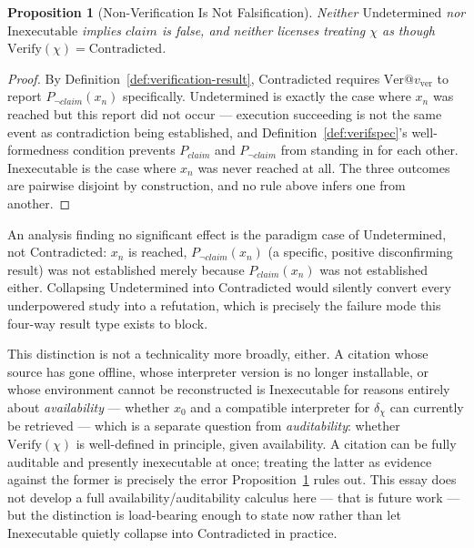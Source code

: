 \documentclass[11pt]{article}
\newtheorem{proposition}[theorem]{Proposition}
\theoremstyle{definition}
\begin{document}
\begin{proposition}[Non-Verification Is Not Falsification]
\label{prop:nonverification-not-false}
Neither $\mathrm{Undetermined}$ nor $\mathrm{Inexecutable}$ implies $\mathit{claim}$ is false, and neither licenses treating $\chi$ as though $\mathrm{Verify}(\chi) = \mathrm{Contradicted}$.
\end{proposition}
\begin{proof}
By Definition~\ref{def:verification-result}, $\mathrm{Contradicted}$ requires $\mathrm{Ver}@v_{\mathrm{ver}}$ to report $P_{\neg\mathit{claim}}(x_n)$ specifically. $\mathrm{Undetermined}$ is exactly the case where $x_n$ was reached but this report did not occur --- execution succeeding is not the same event as contradiction being established, and Definition~\ref{def:verifspec}'s well-formedness condition prevents $P_{\mathit{claim}}$ and $P_{\neg\mathit{claim}}$ from standing in for each other. $\mathrm{Inexecutable}$ is the case where $x_n$ was never reached at all. The three outcomes are pairwise disjoint by construction, and no rule above infers one from another.
\end{proof}

An analysis finding no significant effect is the paradigm case of $\mathrm{Undetermined}$, not $\mathrm{Contradicted}$: $x_n$ is reached, $P_{\neg\mathit{claim}}(x_n)$ (a specific, positive disconfirming result) was not established merely because $P_{\mathit{claim}}(x_n)$ was not established either. Collapsing $\mathrm{Undetermined}$ into $\mathrm{Contradicted}$ would silently convert every underpowered study into a refutation, which is precisely the failure mode this four-way result type exists to block.

This distinction is not a technicality more broadly, either. A citation whose source has gone offline, whose interpreter version is no longer installable, or whose environment cannot be reconstructed is $\mathrm{Inexecutable}$ for reasons entirely about \emph{availability} --- whether $x_0$ and a compatible interpreter for $\delta_\chi$ can currently be retrieved --- which is a separate question from \emph{auditability}: whether $\mathrm{Verify}(\chi)$ is well-defined in principle, given availability. A citation can be fully auditable and presently inexecutable at once; treating the latter as evidence against the former is precisely the error Proposition~\ref{prop:nonverification-not-false} rules out. This essay does not develop a full availability/auditability calculus here --- that is future work --- but the distinction is load-bearing enough to state now rather than let $\mathrm{Inexecutable}$ quietly collapse into $\mathrm{Contradicted}$ in practice.
\end{document}
